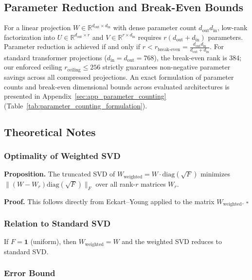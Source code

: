 \subsection{Parameter Reduction and Break-Even Bounds}

For a linear projection $W \in \mathbb{R}^{d_\text{out} \times d_\text{in}}$ with dense parameter count $d_\text{out} d_\text{in}$, low-rank factorization into $U \in \mathbb{R}^{d_\text{out} \times r}$ and $V \in \mathbb{R}^{r \times d_\text{in}}$ requires $r(d_\text{out} + d_\text{in})$ parameters. Parameter reduction is achieved if and only if $r < r_\text{break-even} = \frac{d_\text{out} d_\text{in}}{d_\text{out} + d_\text{in}}$. For standard transformer projections ($d_\text{in} = d_\text{out} = 768$), the break-even rank is 384; our enforced ceiling $r_{\mathrm{ceiling}} \le 256$ strictly guarantees non-negative parameter savings across all compressed projections. An exact formulation of parameter counts and break-even dimensional bounds across evaluated architectures is presented in Appendix~\ref{sec:app_parameter_counting} (Table~\ref{tab:parameter_counting_formulation}).

\subsection{Theoretical Notes}

\subsubsection{Optimality of Weighted SVD}

\textbf{Proposition.} The truncated SVD of $W_\text{weighted} = W \cdot \mathrm{diag}(\sqrt{F})$ 
minimizes $\|(W - W_r) \mathrm{diag}(\sqrt{F})\|_F$ over all rank-$r$ matrices 
$W_r$.

\textbf{Proof.} This follows directly from Eckart--Young applied to the matrix 
$W_\text{weighted}$. $\square$

\subsubsection{Relation to Standard SVD}

If $F = \mathbf{1}$ (uniform), then $W_\text{weighted} = W$ and the weighted 
SVD reduces to standard SVD.

\subsubsection{Error Bound}


